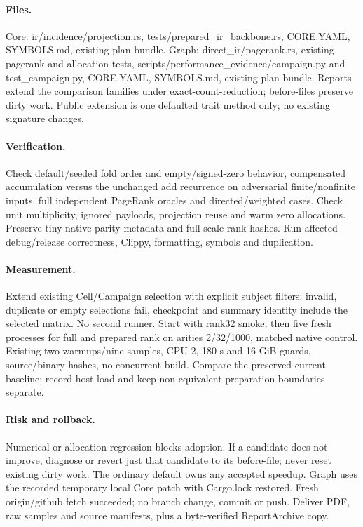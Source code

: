 \documentclass[11pt]{article}
\begin{document}
\paragraph{Files.} Core: ir/incidence/projection.rs, tests/prepared\_ir\_backbone.rs,
CORE.YAML, SYMBOLS.md, existing plan bundle. Graph: direct\_ir/pagerank.rs,
existing pagerank and allocation tests, scripts/performance\_evidence/campaign.py
and test\_campaign.py, CORE.YAML, SYMBOLS.md, existing plan bundle. Reports extend
the comparison families under exact-count-reduction; before-files preserve dirty
work. Public extension is one defaulted trait method only; no existing signature changes.
\paragraph{Verification.} Check default/seeded fold order and empty/signed-zero
behavior, compensated accumulation versus the unchanged add recurrence on adversarial
finite/nonfinite inputs, full independent PageRank oracles and directed/weighted
cases. Check unit multiplicity, ignored payloads, projection reuse and warm zero
allocations. Preserve tiny native parity metadata and full-scale rank hashes.
Run affected debug/release correctness, Clippy, formatting, symbols and duplication.
\paragraph{Measurement.} Extend existing Cell/Campaign selection with explicit
subject filters; invalid, duplicate or empty selections fail, checkpoint and summary
identity include the selected matrix. No second runner. Start with rank32 smoke;
then five fresh processes for full and prepared rank on arities 2/32/1000, matched
native control. Existing two warmups/nine samples, CPU 2, 180 s and 16 GiB guards,
source/binary hashes, no concurrent build. Compare the preserved current baseline;
record host load and keep non-equivalent preparation boundaries separate.
\paragraph{Risk and rollback.} Numerical or allocation regression blocks adoption.
If a candidate does not improve, diagnose or revert just that candidate to its
before-file; never reset existing dirty work. The ordinary default owns any accepted
speedup. Graph uses the recorded temporary local Core patch with Cargo.lock restored.
Fresh origin/github fetch succeeded; no branch change, commit or push. Deliver PDF,
raw samples and source manifests, plus a byte-verified ReportArchive copy.
\end{document}
